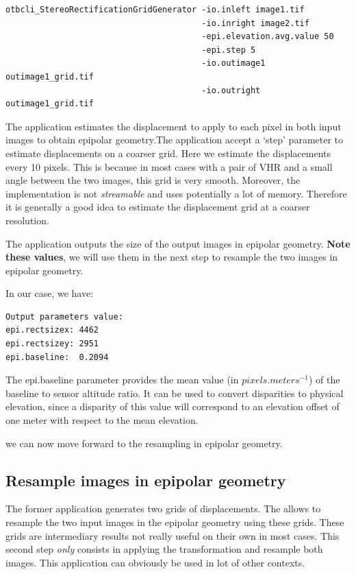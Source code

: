 \begin{verbatim}
otbcli_StereoRectificationGridGenerator -io.inleft image1.tif
                                        -io.inright image2.tif
                                        -epi.elevation.avg.value 50
                                        -epi.step 5
                                        -io.outimage1 outimage1_grid.tif
                                        -io.outright outimage1_grid.tif
\end{verbatim}

The application estimates the displacement to apply to each pixel in
both input images to obtain epipolar geometry.The application accept a
`step' parameter to estimate displacements on a coarser grid. Here we
estimate the displacements every 10 pixels. This is because in most
cases with a pair of VHR and a small angle between the two images,
this grid is very smooth. Moreover, the implementation is
not \textit{streamable} and uses potentially a lot of
memory. Therefore it is generally a good idea to estimate the
displacement grid at a coarser resolution.

The application outputs the size of the output images in epipolar
geometry. \textbf{Note these values}, we will use them in the next step to
resample the two images in epipolar geometry.

In our case, we have:

\begin{verbatim}
Output parameters value:
epi.rectsizex: 4462
epi.rectsizey: 2951
epi.baseline:  0.2094
\end{verbatim}

The epi.baseline parameter provides the mean value (in $pixels.meters^{-1}$) of the
baseline to sensor altitude ratio. It can be used to convert disparities to
physical elevation, since a disparity of this value will correspond to an
elevation offset of one meter with respect to the mean elevation.

we can now move forward to the resampling in epipolar geometry.

\subsection{Resample images in epipolar geometry}

The former application generates two grids of
displacements. The  allows to
resample the two input images in the epipolar geometry using these
grids. These grids are intermediary results not really useful on their
own in most cases. This second step \textit{only} consists in applying
the transformation and resample both images. This application can
obviously be used in lot of other contexts.

